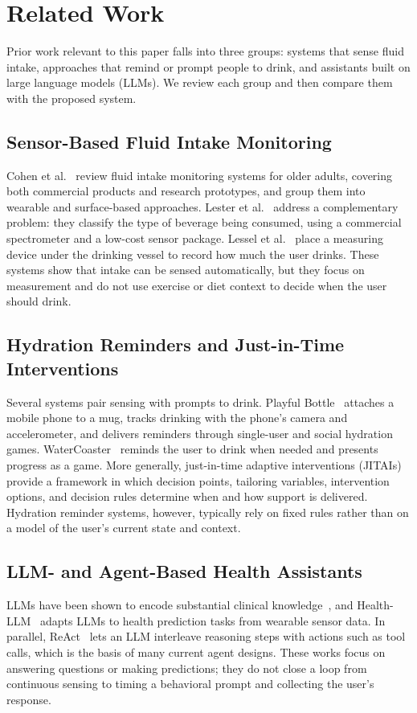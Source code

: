 \documentclass[conference]{IEEEtran}
\begin{document}
\section{Related Work}
\label{sec:related}

Prior work relevant to this paper falls into three groups: systems that sense fluid intake, approaches that remind or prompt people to drink, and assistants built on large language models (LLMs). We review each group and then compare them with the proposed system.

\subsection{Sensor-Based Fluid Intake Monitoring}
Cohen et al.~\cite{cohen2021fluid} review fluid intake monitoring systems for older adults, covering both commercial products and research prototypes, and group them into wearable and surface-based approaches. Lester et al.~\cite{lester2010automatic} address a complementary problem: they classify the type of beverage being consumed, using a commercial spectrometer and a low-cost sensor package. Lessel et al.~\cite{lessel2016watercoaster} place a measuring device under the drinking vessel to record how much the user drinks. These systems show that intake can be sensed automatically, but they focus on measurement and do not use exercise or diet context to decide when the user should drink.

\subsection{Hydration Reminders and Just-in-Time Interventions}
Several systems pair sensing with prompts to drink. Playful Bottle~\cite{chiu2009playful} attaches a mobile phone to a mug, tracks drinking with the phone's camera and accelerometer, and delivers reminders through single-user and social hydration games. WaterCoaster~\cite{lessel2016watercoaster} reminds the user to drink when needed and presents progress as a game. More generally, just-in-time adaptive interventions (JITAIs)~\cite{nahumshani2018jitai} provide a framework in which decision points, tailoring variables, intervention options, and decision rules determine when and how support is delivered. Hydration reminder systems, however, typically rely on fixed rules rather than on a model of the user's current state and context.

\subsection{LLM- and Agent-Based Health Assistants}
LLMs have been shown to encode substantial clinical knowledge~\cite{singhal2023llm}, and Health-LLM~\cite{kim2024healthllm} adapts LLMs to health prediction tasks from wearable sensor data. In parallel, ReAct~\cite{yao2023react} lets an LLM interleave reasoning steps with actions such as tool calls, which is the basis of many current agent designs. These works focus on answering questions or making predictions; they do not close a loop from continuous sensing to timing a behavioral prompt and collecting the user's response.
\end{document}
